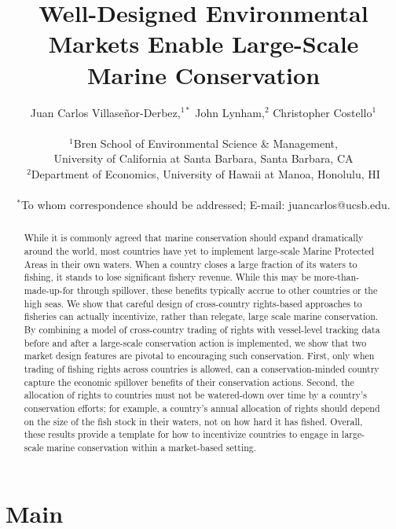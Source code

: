\documentclass[12pt]{article}
\title{Well-Designed Environmental Markets Enable Large-Scale Marine Conservation}
\author{Juan Carlos Villase\~{n}or-Derbez,$^{1\ast}$ John Lynham,$^{2}$ Christopher Costello$^{1}$\\
\\
\normalsize{$^{1}$Bren School of Environmental Science \& Management,}\\
\normalsize{University of California at Santa Barbara, Santa Barbara, CA}\\
\normalsize{$^{2}$Department of Economics, University of Hawaii at Manoa, Honolulu, HI}\\
\\
\normalsize{$^\ast$To whom correspondence should be addressed; E-mail: juancarlos@ucsb.edu.}
}
\date{}
\begin{document}

\baselineskip24pt


\maketitle



\begin{abstract}
While it is commonly agreed that marine conservation should expand dramatically around the world, most countries have yet to implement large-scale Marine Protected Areas in their own waters. When a country closes a large fraction of its waters to fishing, it stands to lose significant fishery revenue. While this may be more-than-made-up-for through spillover, these benefits typically accrue to other countries or the high seas. We show that careful design of cross-country rights-based approaches to fisheries can actually incentivize, rather than relegate, large scale marine conservation. By combining a model of cross-country trading of rights with vessel-level tracking data before and after a large-scale conservation action is implemented, we show that two market design features are pivotal to encouraging such conservation. First, only when trading of fishing rights across countries is allowed, can a conservation-minded country capture the economic spillover benefits of their conservation actions. Second, the allocation of rights to countries must not be watered-down over time by a country's conservation efforts; for example, a country's annual allocation of rights should depend on the size of the fish stock in their waters, not on how hard it has fished. Overall, these results provide a template for how to incentivize countries to engage in large-scale marine conservation within a market-based setting.
\end{abstract}

\clearpage

\section{Main}
\end{document}
